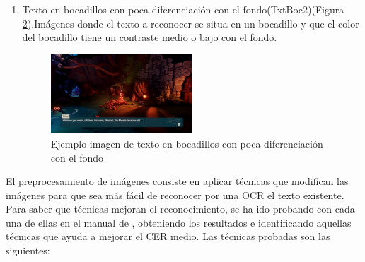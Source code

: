 \begin{enumerate}
\begin{figure}[H]
		\label{fig:TxTBoc}
	\end{figure}
	\item Texto en bocadillos con poca diferenciación con el fondo(TxtBoc2)(Figura \ref{fig:TxtBoc2}).Imágenes donde el texto a reconocer se situa en un bocadillo y que el color del bocadillo tiene un contraste medio o bajo con el fondo.
	\begin{figure}[H]
		\centering
		\includegraphics[width = 0.5\textwidth]{Imagenes/OCR/Boc2.png}
		\caption{Ejemplo imagen de texto en bocadillos con poca diferenciación con el fondo }
		\label{fig:TxtBoc2}
	\end{figure}
\end{enumerate} 


El preprocesamiento de imágenes consiste en aplicar técnicas que modifican las imágenes para que sea más fácil de reconocer por una OCR el texto existente.
Para saber que técnicas mejoran el reconocimiento, se ha ido probando con cada una de ellas en el manual de \cite{OpenCVProcessing}, obteniendo los resultados e identificando aquellas técnicas que ayuda a mejorar el CER medio.
Las técnicas probadas son las siguientes:

